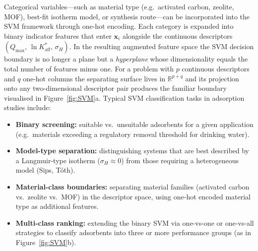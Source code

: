 \documentclass[journal=jacsat,manuscript=article]{achemso}
\begin{document}
	Categorical variables---such as material type (e.g.\ activated carbon, zeolite, MOF), best-fit isotherm model, or synthesis route---can be incorporated into the SVM framework through one-hot encoding. Each category is expanded into binary indicator features that enter $\mathbf{x}_i$ alongside the continuous descriptors $(Q_{\max},\, \ln K_{\mathrm{aff}}^{\ast},\, \sigma_H)$. In the resulting augmented feature space the SVM decision boundary is no longer a plane but a \emph{hyperplane} whose dimensionality equals the total number of features minus one. For a problem with $p$ continuous descriptors and $q$ one-hot columns the separating surface lives in $\mathbb{R}^{p+q}$ and its projection onto any two-dimensional descriptor pair produces the familiar boundary visualised in Figure~\ref{fig:SVM}a. Typical SVM classification tasks in adsorption studies include:
	\begin{itemize}
		\item \textbf{Binary screening:} suitable vs.\ unsuitable adsorbents for a given application (e.g.\ materials exceeding a regulatory removal threshold for drinking water).
		\item \textbf{Model-type separation:} distinguishing systems that are best described by a Langmuir-type isotherm ($\sigma_H \approx 0$) from those requiring a heterogeneous model (Sips, T\'{o}th).
		\item \textbf{Material-class boundaries:} separating material families (activated carbon vs.\ zeolite vs.\ MOF) in the descriptor space, using one-hot encoded material type as additional features.
		\item \textbf{Multi-class ranking:} extending the binary SVM via one-vs-one or one-vs-all strategies to classify adsorbents into three or more performance groups (as in Figure~\ref{fig:SVM}b).
	\end{itemize}
\end{document}
